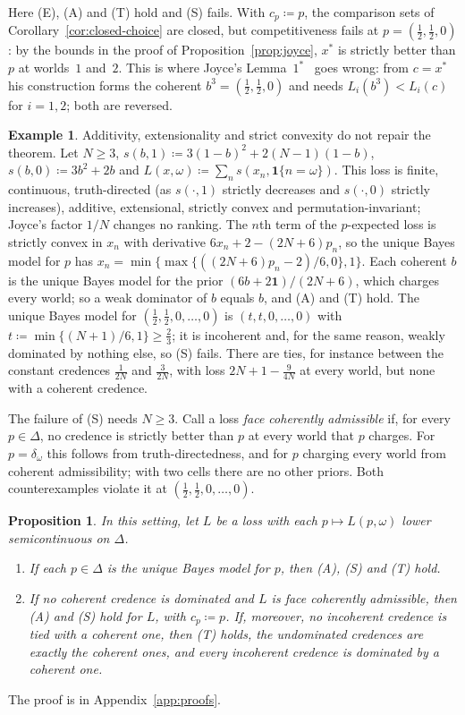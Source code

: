 \documentclass[11pt]{article}
\newtheorem{proposition}[theorem]{Proposition}
\theoremstyle{definition}
\newtheorem{example}[theorem]{Example}
\theoremstyle{remark}
\newcommand{\one}{\mathbf 1}
\begin{document}
Here (E), (A) and (T) hold and (S) fails. With $c_p\coloneqq p$, the comparison sets of Corollary~\ref{cor:closed-choice} are closed, but competitiveness fails at $p=(\frac12,\frac12,0)$: by the bounds in the proof of Proposition~\ref{prop:joyce}, $x^*$ is strictly better than $p$ at worlds~$1$ and~$2$. This is where Joyce's Lemma~$1^*$~\cite[p.~295]{Joyce} goes wrong: from $c=x^*$ his construction forms the coherent $b^3=(\frac12,\frac12,0)$ and needs $L_i(b^3)<L_i(c)$ for $i=1,2$; both are reversed.

\begin{example}\label{ex:joyce-additive}
Additivity, extensionality and strict convexity do not repair the theorem. Let $N\ge3$, $s(b,1)\coloneqq3(1-b)^2+2(N-1)(1-b)$, $s(b,0)\coloneqq3b^2+2b$ and $L(x,\omega)\coloneqq\sum_ns(x_n,\one\{n=\omega\})$. This loss is finite, continuous, truth-directed (as $s(\cdot,1)$ strictly decreases and $s(\cdot,0)$ strictly increases), additive, extensional, strictly convex and permutation-invariant; Joyce's factor $1/N$ changes no ranking. The $n$th term of the $p$-expected loss is strictly convex in $x_n$ with derivative $6x_n+2-(2N+6)p_n$, so the unique Bayes model for $p$ has $x_n=\min\{\max\{((2N+6)p_n-2)/6,0\},1\}$. Each coherent $b$ is the unique Bayes model for the prior $(6b+2\one)/(2N+6)$, which charges every world; so a weak dominator of $b$ equals $b$, and (A) and (T) hold. The unique Bayes model for $(\frac12,\frac12,0,\dots,0)$ is $(t,t,0,\dots,0)$ with $t\coloneqq\min\{(N+1)/6,1\}\ge\frac23$; it is incoherent and, for the same reason, weakly dominated by nothing else, so (S) fails. There are ties, for instance between the constant credences $\frac1{2N}$ and $\frac3{2N}$, with loss $2N+1-\frac9{4N}$ at every world, but none with a coherent credence.
\end{example}

The failure of (S) needs $N\ge3$. Call a loss \emph{face coherently admissible} if, for every $p\in\Delta$, no credence is strictly better than $p$ at every world that $p$ charges. For $p=\delta_\omega$ this follows from truth-directedness, and for $p$ charging every world from coherent admissibility; with two cells there are no other priors. Both counterexamples violate it at $(\frac12,\frac12,0,\dots,0)$.

\begin{proposition}\label{prop:joyce-repair}
In this setting, let $L$ be a loss with each $p\mapsto L(p,\omega)$ lower semicontinuous on $\Delta$.
\begin{enumerate}[label=(\alph*)]
\item If each $p\in\Delta$ is the unique Bayes model for $p$, then (A), (S) and (T) hold.
\item If no coherent credence is dominated and $L$ is face coherently admissible, then (A) and (S) hold for $L$, with $c_p\coloneqq p$. If, moreover, no incoherent credence is tied with a coherent one, then (T) holds, the undominated credences are exactly the coherent ones, and every incoherent credence is dominated by a coherent one.
\end{enumerate}
\end{proposition}
The proof is in Appendix~\ref{app:proofs}.
\end{document}

